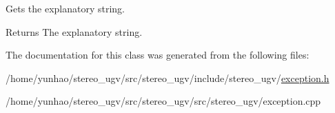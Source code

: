 Gets the explanatory string. 

\begin{DoxyReturn}{Returns}
The explanatory string. 
\end{DoxyReturn}


The documentation for this class was generated from the following files\+:\begin{DoxyCompactItemize}
\item 
/home/yunhao/stereo\+\_\+ugv/src/stereo\+\_\+ugv/include/stereo\+\_\+ugv/\hyperlink{exception_8h}{exception.\+h}\item 
/home/yunhao/stereo\+\_\+ugv/src/stereo\+\_\+ugv/src/stereo\+\_\+ugv/exception.\+cpp\end{DoxyCompactItemize}

